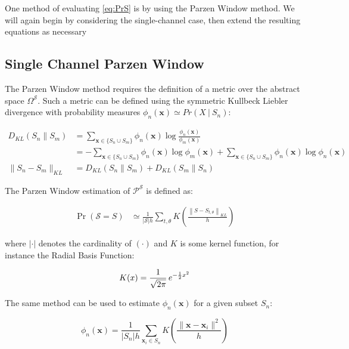 \documentclass[10pt]{article}
\begin{document}
One method of evaluating \ref{eq:PrS} is by using the Parzen Window method.  We will again begin by considering the single-channel case, then extend the resulting equations as necessary

\subsection{ Single Channel Parzen Window}

The Parzen Window method requires the definition of a metric over the abstract space \( \Omega^\mathcal{S} \).  Such a metric can be defined using the symmetric Kullbeck Liebler divergence with probability measures \( \phi_n(\mathbf{x}) \simeq Pr(X \ | \ S_n) \):

\begin{align} \label{eq:KLsingle}
D_{KL}(S_n\|S_m) &= \sum_{\mathbf{x} \in \{ S_n \cup S_m \} } \phi_n( \mathbf{x} ) \log \frac{ \phi_n(\mathbf{x}) }{ \phi_m( \mathbf{x} ) } \nonumber \\
&= -\sum_{\mathbf{x} \in \{ S_n \cup S_m \} } \phi_n(\mathbf{x}) \log \phi_m(\mathbf{x}) + \sum_{\mathbf{x} \in \{ S_n \cup S_m \} } \phi_n(\mathbf{x}) \log \phi_n(\mathbf{x}) \\
\|S_n - S_m\|_{KL} &= D_{KL}(S_n\|S_m) + D_{KL}(S_m\|S_n)
\end{align}

The Parzen Window estimation of \( \mathcal{P}^\mathcal{S} \) is defined as:

\begin{align} \label{eq:PrSParzenSingle}
\Pr( \mathcal{S} = S ) &\simeq \frac{1}{|\mathcal{S}| h} \sum_{t,\theta} K \left( \frac{ \left\| S - S_{t,\theta} \right\|_{KL} } { h } \right)
\end{align}

where \( | \cdot | \) denotes the cardinality of \( ( \cdot ) \) and \( K \) is some kernel function, for instance the Radial Basis Function:

\begin{equation} \label{eq:RBFparzen}
K(x) = {1 \over \sqrt{2\pi} }\,e^{-\frac{1}{2}x^2}
\end{equation}

The same method can be used to estimate \( \phi_n(\mathbf{x}) \) for a given subset \( S_n \):

\begin{equation} \label{eq:PhiSingle}
\phi_n( \mathbf{x} ) = \frac{1}{|S_n| h} \sum_{\mathbf{x}_i \in S_n} K \left( \frac{ \| \mathbf{x} - \mathbf{x}_i \|^2 }{ h} \right)
\end{equation}
\end{document}

